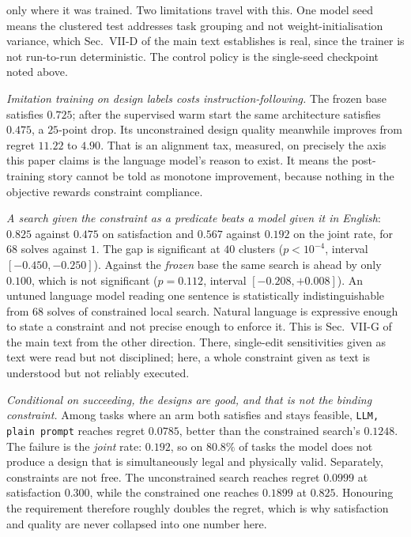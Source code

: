 only where it was trained. Two limitations travel with this.  One model seed means the clustered test
addresses task grouping and not weight-initialisation variance, which Sec.~VII-D of the main text establishes is real, since the trainer is not run-to-run deterministic.  The control
policy is the single-seed checkpoint noted above.

\emph{Imitation training on design labels costs instruction-following.}  The frozen
base satisfies $0.725$; after the supervised warm start the same architecture
satisfies $0.475$, a $25$-point drop.  Its unconstrained design quality meanwhile
improves from regret $11.22$ to $4.90$. That is an alignment tax, measured, on precisely the axis this paper claims is the
language model's reason to exist.  It means the post-training story cannot be told as
monotone improvement, because nothing in the objective rewards constraint compliance.

\emph{A search given the constraint as a predicate beats a model given it in
English}: $0.825$ against $0.475$ on satisfaction and $0.567$ against $0.192$ on the
joint rate, for $68$ solves against $1$.  The gap is significant at $40$ clusters
($p<10^{-4}$, interval $[-0.450,-0.250]$). Against the \emph{frozen} base the same search is ahead by only $0.100$, which is
not significant ($p=0.112$, interval $[-0.208,+0.008]$).  An untuned language model
reading one sentence is statistically indistinguishable from $68$ solves of
constrained local search. Natural
language is expressive enough to state a constraint and not precise enough to enforce it. This is
Sec.~VII-G of the main text from the other direction. There, single-edit sensitivities given as text were read
but not disciplined; here, a whole constraint given as text is understood but not reliably executed.

\emph{Conditional on succeeding, the designs are good, and that is not the binding constraint.} Among tasks
where an arm both satisfies and stays feasible, \texttt{LLM, plain prompt} reaches regret $0.0785$, better than
the constrained search's $0.1248$. The failure is the \emph{joint} rate: $0.192$, so on $80.8\%$ of tasks
the model does not produce a design that is simultaneously legal and physically valid. Separately, constraints are not free.  The unconstrained search reaches regret
$0.0999$ at satisfaction $0.300$, while the constrained one reaches $0.1899$ at
$0.825$.  Honouring the requirement therefore roughly doubles the regret, which is
why satisfaction and quality are never collapsed into one number here.

